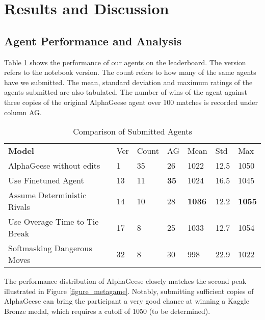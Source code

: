 \section{Results and Discussion}
\label{section_discussion}

\subsection{Agent Performance and Analysis}
\label{subsection_results}

Table \ref{table_scores} shows the performance of our agents on the leaderboard. The version refers to the notebook version. The count refers to how many of the same agents have we submitted. The mean, standard deviation and maximum ratings of the agents submitted are also tabulated. The number of wins of the agent against three copies of the original AlphaGeese agent over 100 matches is recorded under column AG.


\begin{table}[hbt!]
\begin{tabular}{lllllll}
\textbf{Model}                & Ver & Count & AG & Mean          & Std  & Max           \\
AlphaGeese without edits      & 1   & 35    & 26 & 1022          & 12.5 & 1050          \\
Use Finetuned Agent           & 13  & 11    & \textbf{35} & 1024 & 16.5 & 1045          \\
Assume Deterministic Rivals   & 14  & 10    & 28 & \textbf{1036} & 12.2 & \textbf{1055} \\
Use Overage Time to Tie Break & 17  & 8     & 25 & 1033          & 12.7 & 1054          \\
Softmasking Dangerous Moves   & 32  & 8     & 30 & 998           & 22.9 & 1022         
\end{tabular}
\caption{Comparison of Submitted Agents}
\label{table_scores}
\end{table}

The performance distribution of AlphaGeese closely matches the second peak illustrated in Figure \ref{figure_metagame}. Notably, submitting sufficient copies of AlphaGeese \cite{notebook_alphageese_baseline} can bring the participant a very good chance at winning a  Kaggle Bronze medal, which requires a cutoff of 1050 (to be determined).

